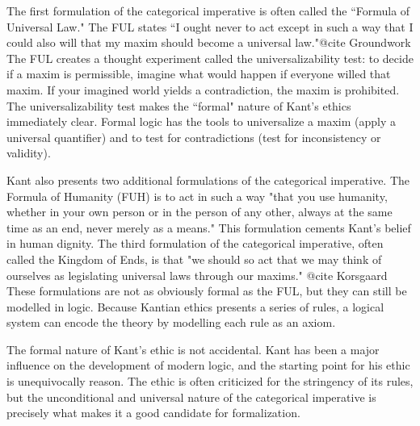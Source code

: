 \begin{isabellebody}
\begin{isamarkuptext}
The first formulation of the categorical imperative is often called the ``Formula of Universal Law."
The FUL states ``I ought never to act except in such a way that I could also will that my maxim should 
become a universal law."{@cite Groundwork} The FUL creates a thought experiment called the universalizability test: to 
decide if a maxim is permissible, imagine what would happen if everyone willed that maxim. If your 
imagined world yields a contradiction, the maxim is prohibited. The universalizability test makes the 
``formal" nature of Kant's ethics immediately clear. Formal logic has the tools to universalize a 
maxim (apply a universal quantifier) and to test for contradictions (test for inconsistency or 
validity). 

Kant also presents two additional formulations of the categorical imperative. The Formula of Humanity (FUH)
is to act in such a way "that you use humanity, whether in your own person or in the person
of any other, always at the same time as an end, never merely as a means." This formulation cements 
Kant's belief in human dignity. The third formulation of the categorical imperative, often called 
the Kingdom of Ends, is that "we should so act that we may think of ourselves as legislating universal 
laws through our maxims." {@cite Korsgaard} These formulations are not as obviously formal as the FUL, 
but they can still be modelled in logic. Because Kantian ethics presents a series of rules, a logical
system can encode the theory by modelling each rule as an axiom.

The formal nature of Kant's ethic is not accidental. Kant has been a major influence on the 
development of modern logic, and the starting point for his ethic is unequivocally reason. The ethic 
is often criticized for the stringency of its rules, but the unconditional and universal nature of 
the categorical imperative is precisely what makes it a good candidate for formalization. 


\end{isamarkuptext}
\end{isabellebody}

